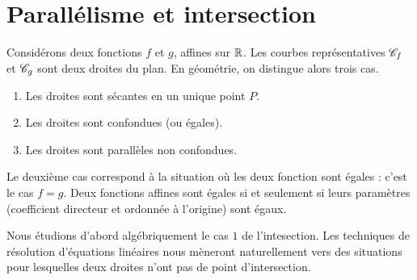 



\section{Parallélisme et intersection}

Considérons deux fonctions $f$ et $g$, affines sur $\mathbb{R}$.
Les courbes représentatives $\mathcal{C}_f$ et $\mathcal{C}_g$ sont deux droites du plan.
En géométrie, on distingue alors trois cas.
	\begin{enumerate}
		\item Les droites sont sécantes en un unique point $P$.
		\item Les droites sont confondues (ou égales).
		\item Les droites sont parallèles non confondues.
	\end{enumerate}
Le deuxième cas correspond à la situation où les deux fonction sont égales : c'est le cas $f=g$.
Deux fonctions affines sont égales si et seulement si leurs paramètres (coefficient directeur et ordonnée à l'origine) sont égaux.

Nous étudions d'abord algébriquement le cas $1$ de l'intesection.
Les techniques de résolution d'équations linéaires nous mèneront naturellement vers des situations pour lesquelles deux droites n'ont pas de point d'intersection.

